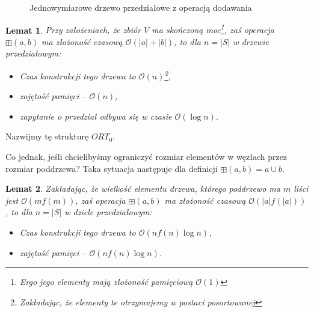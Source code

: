 \documentclass[a4paper]{article}
\newtheorem{lemma}{Lemat}
\begin{document}
\begin{figure}[!h]
\centering
{}
\caption{Jednowymiarowe drzewo przedziałowe z operacją dodawania}
\label{fig:tree1}
\end{figure}

\begin{lemma}
Przy założeniach, że zbiór $V$ ma skończoną moc\footnote{Ergo jego elementy mają złożoność pamięciową $\mathcal{O}(1)$},
zaś operacja $\boxplus(a, b)$ ma złożoność czasową $\mathcal{O}(|a|+|b|)$,
to dla $n = |S|$ w drzewie przedziałowym:
\begin{itemize}[itemsep=0pt]
\item Czas konstrukcji tego drzewa to $\mathcal{O}(n)$\footnote{Zakładając, że elementy te otrzymujemy w postaci posortowanej},
\item zajętość pamięci -- $\mathcal{O}(n)$,
\item zapytanie o przedział odbywa się w czasie $\mathcal{O}(\log{} n)$.
\end{itemize}
\end{lemma}

Nazwijmy tę strukturę $ORT_0$.

Co jednak, jeśli chcielibyśmy ograniczyć rozmiar elementów w węzłach przez rozmiar poddrzewa? Taka sytuacja następuje dla definicji $\boxplus(a, b) = a \cup b$.

\begin{lemma}
\label{lem:generalcplx}
Zakładając, że wielkość elementu drzewa, którego poddrzewo ma $m$ liści jest $\mathcal{O}(m f(m))$,
zaś operacja $\boxplus(a, b)$ ma złożoność czasową $\mathcal{O}(|a| f(|a|))$,
to dla $n = |S|$ w dziele przedziałowym:
\begin{itemize}[itemsep=0pt]
\item Czas konstrukcji tego drzewa to $\mathcal{O}(n f(n) \log{}n)$,
\item zajętość pamięci -- $\mathcal{O}(n f(n) \log{}n)$.
\end{itemize}
\end{lemma}
\end{document}
